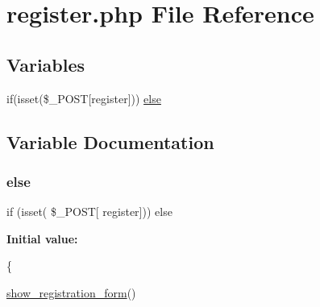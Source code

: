 \hypertarget{register_8php}{}\section{register.\+php File Reference}
\label{register_8php}
\subsection*{Variables}
\begin{DoxyCompactItemize}
\item 
if(isset(\$\+\_\+\+P\+O\+ST\mbox{[}\textquotesingle{}register\textquotesingle{}\mbox{]})) \hyperlink{register_8php_aa3983eb315a187bc270eb70fc93e9d53}{else}
\end{DoxyCompactItemize}


\subsection{Variable Documentation}
\mbox{\label{register_8php_aa3983eb315a187bc270eb70fc93e9d53}} 
\subsubsection{\texorpdfstring{else}{else}}
{\footnotesize\ttfamily if (isset( \$\+\_\+\+P\+O\+ST\mbox{[} \textquotesingle{}register\textquotesingle{}\mbox{]})) else}

{\bfseries Initial value\+:}
\begin{DoxyCode}
\{
    
        \hyperlink{display_8functions_8inc_8php_a1b0595a93d919969c541477d6c0b71ea}{show\_registration\_form}()
\end{DoxyCode}
